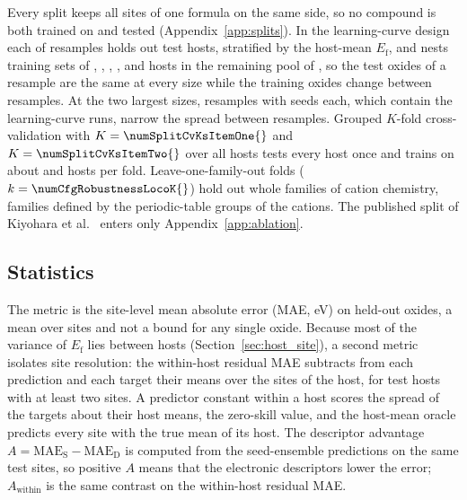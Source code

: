 Every split keeps all sites of one formula on the same side, so no compound is both trained on and tested (Appendix~\ref{app:splits}). In the learning-curve design each of \numCfgSplitNOuterResamples{} resamples holds out \numSplitMetaNTestHosts{} test hosts, stratified by the host-mean $E_\mathrm{f}$, and nests training sets of \numCfgBudgetsHostsItemOne{}, \numCfgBudgetsHostsItemTwo{}, \numCfgBudgetsHostsItemThree{}, \numCfgBudgetsHostsItemFour{}, \numCfgBudgetsHostsItemFive{} and \numCfgBudgetsHostsItemSix{} hosts in the remaining pool of \numSplitMetaPoolSize{}, so the test oxides of a resample are the same at every size while the training oxides change between resamples. At the two largest sizes, \numPrecisionABFourHundredBSixHundredFiftyFourSubsetsThirtyXFiveNResamples{} resamples with \numPrecisionABFourHundredBSixHundredFiftyFourSubsetsThirtyXFiveNSeeds{} seeds each, which contain the learning-curve runs, narrow the spread between resamples. Grouped $K$-fold cross-validation with $K = \numSplitCvKsItemOne{}$ and $K = \numSplitCvKsItemTwo{}$ over all \numSplitCvNHosts{} hosts tests every host once and trains on about \numNetCvTenHosts{} and \numNetCvTwentyHosts{} hosts per fold. Leave-one-family-out folds ($k = \numCfgRobustnessLocoK{}$) hold out whole families of cation chemistry, \numSplitLocoNFamilies{} families defined by the periodic-table groups of the cations. The published split of Kiyohara et al.\ \citep{Kiyohara2025machinelearning} enters only Appendix~\ref{app:ablation}.

\subsection{Statistics}
\label{sec:statistics}

The metric is the site-level mean absolute error (MAE, eV) on held-out oxides, a mean over sites and not a bound for any single oxide. Because most of the variance of $E_\mathrm{f}$ lies between hosts (Section~\ref{sec:host_site}), a second metric isolates site resolution: the within-host residual MAE subtracts from each prediction and each target their means over the sites of the host, for test hosts with at least two sites. A predictor constant within a host scores the spread of the targets about their host means, the zero-skill value, and the host-mean oracle predicts every site with the true mean of its host. The descriptor advantage $A = \mathrm{MAE}_\mathrm{S} - \mathrm{MAE}_\mathrm{D}$ is computed from the seed-ensemble predictions on the same test sites, so positive $A$ means that the electronic descriptors lower the error; $A_\mathrm{within}$ is the same contrast on the within-host residual MAE.


